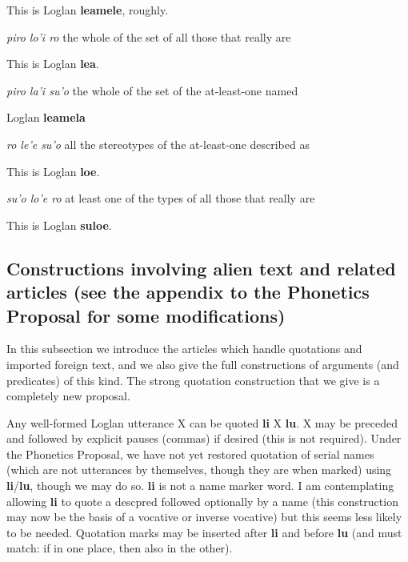 \documentclass[12pt]{book}
\begin{document}
{\begin{description}
This is Loglan {\bf leamele}, roughly.

\item[lo'i: ]	{\em piro lo'i ro \/}	 the whole of the set of all those that really are

This is Loglan {\bf lea}.

\item[la'i: ]	{\em piro la'i su'o\/}  	the whole of the set of the at-least-one named

Loglan {\bf leamela}

\item[le'e: ]	{\em ro le'e su'o\/} 	all the stereotypes of the at-least-one described as

This is Loglan {\bf loe}.

\item[lo'e: ]	{\em su'o lo'e ro\/} 	at least one of the types of all those that really are

This is Loglan {\bf suloe}.

\end{description}

\subsection{Constructions involving alien text and related articles (see the appendix to the Phonetics Proposal for some modifications)}

In this subsection we introduce the articles which handle quotations and imported foreign text, and we also give the full constructions of arguments (and predicates) of this kind.   The strong quotation construction that we give is a completely new proposal.

Any well-formed Loglan utterance X can be quoted {\bf li} X {\bf lu}.  X may be preceded and followed by explicit pauses (commas) if desired (this is not required).  Under the Phonetics Proposal, we have not yet restored quotation of serial names (which are not utterances by themselves, though they are when marked) using {\bf li}/{\bf lu}, though we may do so.  {\bf li} is not a name marker word.
I am contemplating allowing {\bf li} to quote a descpred followed optionally by a name (this construction may now be the basis of a vocative or inverse vocative) but this seems less likely to be needed.  Quotation marks may be inserted after {\bf li} and before {\bf lu} (and must match:  if in one place, then also in the other).

}
\end{document}
